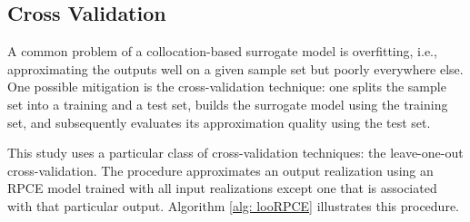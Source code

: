 %
%

\subsection{Cross Validation}
\label{ssec: cross validation}

A common problem of a collocation-based surrogate model is overfitting, i.e., approximating the outputs well on a given sample set but poorly everywhere else.
One possible mitigation is the cross-validation technique: one splits the sample set into a training and a test set, builds the surrogate model using the training set, and subsequently evaluates its approximation quality using the test set.

This study uses a particular class of cross-validation techniques: the leave-one-out cross-validation.
The procedure approximates an output realization using an RPCE model trained with all input realizations except one that is associated with that particular output.
Algorithm \ref{alg: looRPCE} illustrates this procedure.

